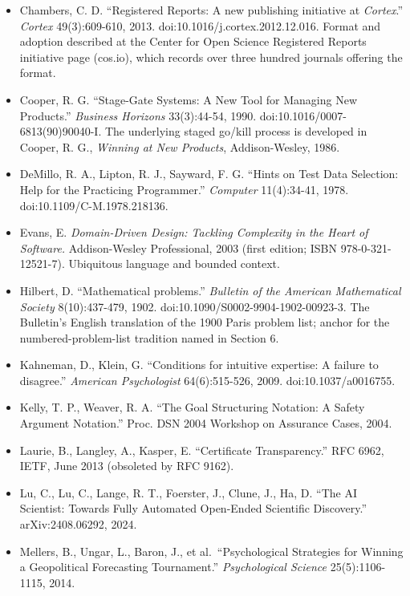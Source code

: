 \documentclass[
  11pt,
]{article}
\providecommand{\tightlist}{%
  \setlength{\itemsep}{0pt}\setlength{\parskip}{0pt}}
\begin{document}
\begin{itemize}
\tightlist
\item
  Chambers, C. D. ``Registered Reports: A new publishing initiative at
  \emph{Cortex}.'' \emph{Cortex} 49(3):609-610, 2013.
  doi:10.1016/j.cortex.2012.12.016. Format and adoption described at the
  Center for Open Science Registered Reports initiative page (cos.io),
  which records over three hundred journals offering the format.
\item
  Cooper, R. G. ``Stage-Gate Systems: A New Tool for Managing New
  Products.'' \emph{Business Horizons} 33(3):44-54, 1990.
  doi:10.1016/0007-6813(90)90040-I. The underlying staged go/kill
  process is developed in Cooper, R. G., \emph{Winning at New Products},
  Addison-Wesley, 1986.
\item
  DeMillo, R. A., Lipton, R. J., Sayward, F. G. ``Hints on Test Data
  Selection: Help for the Practicing Programmer.'' \emph{Computer}
  11(4):34-41, 1978. doi:10.1109/C-M.1978.218136.
\item
  Evans, E. \emph{Domain-Driven Design: Tackling Complexity in the Heart
  of Software.} Addison-Wesley Professional, 2003 (first edition; ISBN
  978-0-321-12521-7). Ubiquitous language and bounded context.
\item
  Hilbert, D. ``Mathematical problems.'' \emph{Bulletin of the American
  Mathematical Society} 8(10):437-479, 1902.
  doi:10.1090/S0002-9904-1902-00923-3. The Bulletin's English
  translation of the 1900 Paris problem list; anchor for the
  numbered-problem-list tradition named in Section 6.
\item
  Kahneman, D., Klein, G. ``Conditions for intuitive expertise: A
  failure to disagree.'' \emph{American Psychologist} 64(6):515-526,
  2009. doi:10.1037/a0016755.
\item
  Kelly, T. P., Weaver, R. A. ``The Goal Structuring Notation: A Safety
  Argument Notation.'' Proc. DSN 2004 Workshop on Assurance Cases, 2004.
\item
  Laurie, B., Langley, A., Kasper, E. ``Certificate Transparency.'' RFC
  6962, IETF, June 2013 (obsoleted by RFC 9162).
\item
  Lu, C., Lu, C., Lange, R. T., Foerster, J., Clune, J., Ha, D. ``The AI
  Scientist: Towards Fully Automated Open-Ended Scientific Discovery.''
  arXiv:2408.06292, 2024.
\item
  Mellers, B., Ungar, L., Baron, J., et al.~``Psychological Strategies
  for Winning a Geopolitical Forecasting Tournament.''
  \emph{Psychological Science} 25(5):1106-1115, 2014.

\end{itemize}
\end{document}
